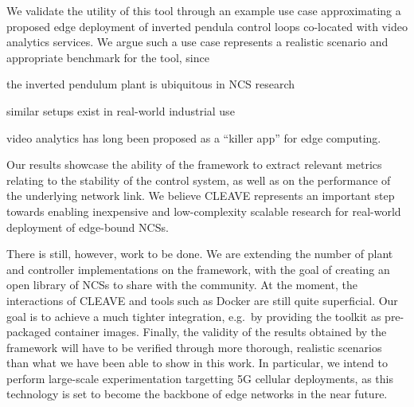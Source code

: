 We validate the utility of this tool through an example use case approximating a proposed edge deployment of inverted pendula control loops co-located with video analytics services.
We argue such a use case represents a realistic scenario and appropriate benchmark for the tool, since
\begin{enumerate*}[itemjoin={{; }}, itemjoin*={{; and }}]
    \item the inverted pendulum plant is ubiquitous in \gls{NCS} research
    \item similar setups exist in real-world industrial use
    \item video analytics has long been proposed as a ``killer app'' for edge computing.
\end{enumerate*}
Our results showcase the ability of the framework to extract relevant metrics relating to the stability of the control system, as well as on the performance of the underlying network link.
We believe \gls{CLEAVE} represents an important step towards enabling inexpensive and low-complexity scalable research for real-world deployment of edge-bound \glspl{NCS}.

There is still, however, work to be done.
We are extending the number of plant and controller implementations on the framework, with the goal of creating an open library of \glspl{NCS} to share with the community.
At the moment, the interactions of \gls{CLEAVE} and tools such as Docker are still quite superficial.
Our goal is to achieve a much tighter integration, e.g.\ by providing the toolkit as pre-packaged container images.
Finally, the validity of the results obtained by the framework will have to be verified through more thorough, realistic scenarios than what we have been able to show in this work.
In particular, we intend to perform large-scale experimentation targetting 5G cellular deployments, as this technology is set to become the backbone of edge networks in the near future.
